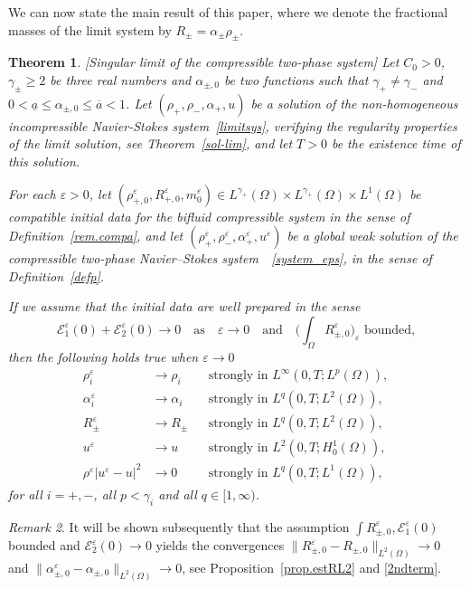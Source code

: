 \documentclass[11pt, twoside, a4paper]{article}
\theoremstyle{plain}
\newtheorem{theorem}{Theorem}[section]
\theoremstyle{remark}
\newtheorem{remark}[theorem]{Remark}
\numberwithin{equation}{section}
\def\EE{{\mathcal E}}
\renewcommand{\leq}{\leqslant}\renewcommand{\le}{\leqslant}
\renewcommand{\geq}{\geqslant}\renewcommand{\ge}{\geqslant}
\renewcommand{\epsilon}{\varepsilon}
\newcommand{\eps}{\varepsilon}
\begin{document}
We can now state the main result of this paper, where we denote the fractional masses of the limit system by $R_{\pm} = \alpha_{\pm} \rho_{\pm}$.

\begin{theorem}\label{mainth}
 [Singular limit of the compressible two-phase system] Let $C_0>0$, $\gamma_\pm\geq 2$ be three real numbers and $\alpha_{\pm,0}$ be two functions such that $\gamma_+\neq \gamma_-$ and $0<\underline{a}\leq \alpha_{\pm,0} \leq \overline{a} <1$. Let $(\rho_+,\rho_-,\alpha_+,u)$ be a solution of the non-homogeneous incompressible Navier-Stokes system~\eqref{limitsys}, verifying the regularity properties of the limit solution, see Theorem~\ref{sol-lim}, and let $T>0$ be the existence time of this solution.
 
For each $\varepsilon>0$, let $(\rho_{+,0}^\varepsilon, R_{+,0}^\varepsilon, m_0^\varepsilon)\in L^{\gamma_+}(\Omega)\times L^{\gamma_+}(\Omega)\times L^1(\Omega)$ be compatible initial data for the bifluid compressible system in the sense of Definition~\ref{rem.compa}, and let $(\rho^{\epsilon}_+,\rho^{\epsilon}_-,\alpha^{\epsilon}_+,u^{\epsilon})$ be a global weak solution of the compressible two-phase Navier--Stokes system~~\eqref{system_eps}, in the sense of Definition~\ref{defp}.



If we assume that the initial data are well prepared in the sense
\[
\EE_1^\eps(0) + \EE_2^\eps(0)\to 0\quad\text{as}\quad \eps\to 0\quad \text{and} \quad \Big(\int_\Omega R_{\pm,0}^\eps\Big)_\eps \text{ bounded,}
\]
then the following holds true when $\eps\to 0$
 \begin{align*}
\rho_i^\varepsilon &\longrightarrow \rho_i &&\text{strongly in } L^\infty(0,T; L^p(\Omega)), \\
\alpha^\varepsilon_i &\longrightarrow \alpha_i &&\text{strongly in } L^q(0,T; L^2(\Omega)),\\
R_\pm^\varepsilon &\longrightarrow R_\pm &&\text{strongly in } L^q(0,T;L^2(\Omega)),\\
u^\varepsilon &\longrightarrow u &&\text{strongly in } L^2(0,T; H^{1}_0(\Omega)),\\
\rho^\eps|u^\eps-u|^2 &\longrightarrow 0 &&\text{strongly in } L^q(0,T; L^1(\Omega)),
\end{align*}
 for all $i=+,-$, all $p< \gamma_i$ and all $q\in [1,\infty)$.
\end{theorem}

\begin{remark}
It will be shown subsequently that the assumption $\int R_{\pm,0}^\eps,\EE_1^\eps(0)$ bounded and $\EE_{2}^\eps(0) \to 0$ yields the convergences $\| R_{\pm,0}^\eps - R_{\pm,0} \|_{L^2(\Omega)} \to 0$ and $\| \alpha_{\pm,0}^\eps - \alpha_{\pm,0} \|_{L^2(\Omega)} \to 0$, see Proposition~\ref{prop.estRL2} and \eqref{2ndterm}.
\end{remark}
\end{document}
